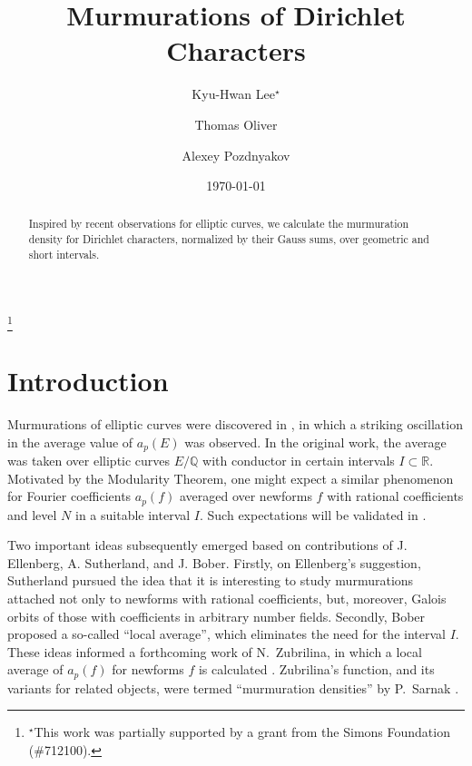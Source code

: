 \documentclass{amsart}
\theoremstyle{definition}
\numberwithin{equation}{section}
\begin{document}
\title[Murmurations of Dirichlet Characters]{Murmurations of Dirichlet Characters}

\date{\today}

\author[K.-H. Lee]{Kyu-Hwan Lee$^{\star}$}
\thanks{$^{\star}$This work was partially supported by a grant from the Simons Foundation (\#712100).}
\address{Department of Mathematics, University of Connecticut, Storrs, CT 06269, U.S.A.}

\author[T. Oliver]{Thomas Oliver}
\address{Teesside University, Middlesbrough, U.K.}

\author[A. Pozdnyakov]{Alexey Pozdnyakov}
\address{Department of Mathematics, University of Connecticut, Storrs, CT 06269, U.S.A.}



\begin{abstract}
Inspired by recent observations for elliptic curves, we calculate the murmuration density for Dirichlet characters, normalized by their Gauss sums, over geometric and short intervals.
\end{abstract}

\maketitle

\section{Introduction}\label{s:intro}
Murmurations of elliptic curves were discovered in \cite{HLOP}, in which a striking oscillation in the average value of $a_p(E)$ was observed.
In the original work, the average was taken over elliptic curves $E/\mathbb{Q}$ with conductor in certain intervals $I\subset\mathbb{R}$. 
Motivated by the Modularity Theorem, one might expect a similar phenomenon for Fourier coefficients $a_p(f)$ averaged over newforms $f$ with rational coefficients and level $N$ in a suitable interval $I$. 
Such expectations will be validated in \cite{HLOPS}.   



Two important ideas subsequently emerged based on contributions of J. Ellenberg, A. Sutherland, and J. Bober.
Firstly, on Ellenberg's suggestion, Sutherland pursued the idea that it is interesting to study murmurations attached not only to newforms with rational coefficients, but, moreover, Galois orbits of those with coefficients in arbitrary number fields. 
Secondly, Bober proposed a so-called ``local average'', which eliminates the need for the interval $I$.
These ideas informed a forthcoming work of N.~Zubrilina, in which a local average of $a_p(f)$ for newforms $f$ is calculated \cite{Z23}.
Zubrilina's function, and its variants for related objects, were termed ``murmuration densities'' by P.~Sarnak \cite{S23}. 
\end{document}
